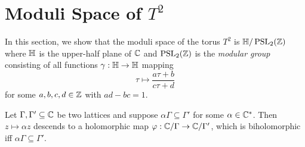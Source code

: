 \documentclass[../Moduli_Spaces_of_Riemann_Surfaces.tex]{subfiles}
\begin{document}
    \section{Moduli Space of $T^2$}
    In this section, we show that the moduli space of the torus $T^2$ is $\mathbb{H}/\operatorname{PSL}_{2}\!\left(\mathbb{Z}\right)$ where $\mathbb{H}$ is the upper-half plane of $\mathbb{C}$ and $\operatorname{PSL}_{2}\!\left(\mathbb{Z}\right)$ is the \textit{modular group} consisting of all functions $\gamma:\mathbb{H}\to\mathbb{H}$ mapping
    \begin{equation*}
        \tau\mapsto\frac{a\tau+b}{c\tau+d}
    \end{equation*}
    for some $a,b,c,d\in\mathbb{Z}$ with $ad-bc=1$.
    \begin{lemma}\label{2.1:lem:moduli_space_torus_1}
        Let $\Gamma,\Gamma'\subseteq\mathbb{C}$ be two lattices and suppose $\alpha\Gamma\subseteq\Gamma'$ for some $\alpha\in\mathbb{C}^\ast$. Then $z\mapsto\alpha z$ descends to a holomorphic map $\varphi:\mathbb{C}/\Gamma\to\mathbb{C}/\Gamma'$, which is biholomorphic iff $\alpha\Gamma\subseteq\Gamma'$.
    \end{lemma}\vspace{-0.08in}
\end{document}
